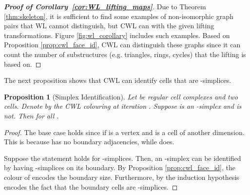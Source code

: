\documentclass{article}
\newtheorem{proposition}[theorem]{Proposition}
\begin{document}
\begin{proof}[\textbf{Proof of Corollary~\ref{cor:WL_lifting_maps}}]
Due to Theorem \ref{thm:skeleton}, it is sufficient to find some examples of non-isomorphic graph pairs that WL cannot distinguish, but CWL can with the given lifting transformations. Figure \ref{fig:wl_corollary} includes such examples. Based on Proposition \ref{prop:cwl_face_id}, CWL can distinguish these graphs since it can count the number of substructures (e.g. triangles, rings, cycles) that the lifting is based on. 
\end{proof}

The next proposition shows that CWL can identify cells that are -simplices. 

\begin{proposition}[Simplex Identification]
\label{prop:cwl_simplex_identification}
Let  be regular cell complexes and  two cells. Denote by  the CWL colouring at iteration . Suppose  is an -simplex and  is not.  Then  for all .
\end{proposition}

\begin{proof}
The base case holds since  if  is a vertex and  is a cell of another dimension. This is because  has no boundary adjacencies, while  does. 

Suppose the statement holds for -simplices. Then, an -simplex can be identified by having  -simplices on its boundary. By Proposition \ref{prop:cwl_face_id}, the colour of  encodes the boundary size. Furthermore, by the induction hypothesis  encodes the fact that the boundary cells are -simplices. 
\end{proof}
\end{document}
